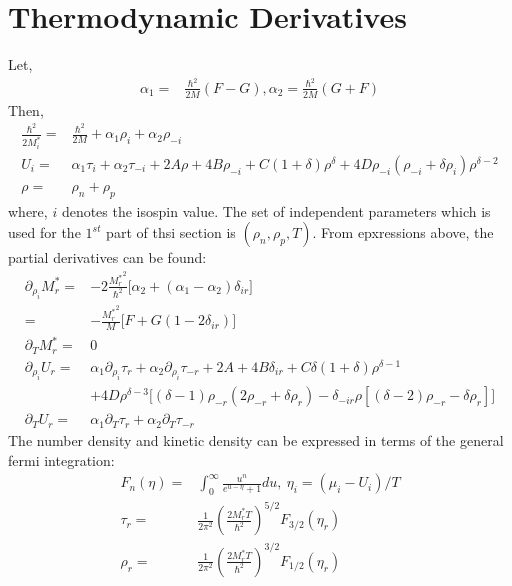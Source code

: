 \documentclass[preprint,prc,preprintnumbers,superscriptaddress,amsmath,amssymb,floatfix]{revtex4-1}
\begin{document}
\section{Thermodynamic Derivatives}
Let,
\begin{equation}
 \begin{split}
  \alpha_1=&\frac{\hbar^2}{2M}(F-G), \alpha_2 =\frac{\hbar^2}{2M} (G+F)
  \end{split}
\end{equation}
Then,
\begin{equation}
 \begin{split}
  \frac{\hbar^2}{2 M^{*}_i}=&\frac{\hbar^2}{2 M}+\alpha_1 \rho_i+\alpha_2 \rho_{-i}\\
  U_i=&\alpha_1 \tau_i+\alpha_2 \tau_{-i}+2A \rho + 4 B \rho_{-i}+ C(1+\delta)\rho^{\delta}+4 D \rho_{-i}(\rho_{-i}+\delta \rho_i)\rho^{\delta-2}\\
  \rho=&\rho_n+\rho_p
 \end{split}
\end{equation}
where, $i$ denotes the isospin value. The set of independent parameters which is used for the $1^{st}$ part of thsi section is $(\rho_n,\rho_p,T)$.
From epxressions above, the partial derivatives can be found:
\begin{equation}
 \begin{split}
  \partial_{\rho_i}M^{*}_r=&-2\frac{{M_r^{*}}^2}{\hbar^2}\big[\alpha_2+(\alpha_1-\alpha_2)\delta_{ir}\big]\\
  =&-\frac{{M_r^{*}}^2}{M}\big[F+G(1-2\delta_{ir})\big]\\
  \partial_{T}M^{*}_r =& 0\\
  \partial_{\rho_i}U_r=& \alpha_1 \partial_{\rho_i}\tau_r+\alpha_2 \partial_{\rho_i}\tau_{-r} + 2 A + 4 B \delta_{ir} + C \delta (1+\delta)\rho^{\delta-1}\\
  &+4 D \rho^{\delta-3} \big[(\delta-1)\rho_{-r}(2\rho_{-r}+\delta \rho_r)-\delta_{-ir}\rho [(\delta-2)\rho_{-r}-\delta \rho_r]\big]\\
  \partial_{T}U_r =& \alpha_1 \partial_{T}\tau_r+\alpha_2 \partial_{T}\tau_{-r}
 \end{split}
\end{equation}
The number density and kinetic density can be expressed in terms of the general fermi integration:
\begin{equation}
 \begin{split}
  F_n(\eta)=&\int_0^{\infty}\frac{u^n}{e^{u-\eta}+1}du,\ \eta_i=(\mu_i-U_i)/T\\
  \tau_r=&\frac{1}{2\pi^2}(\frac{2M^{*}_rT}{\hbar^2})^{5/2}F_{3/2}(\eta_r)\\
  \rho_r=&\frac{1}{2\pi^2}(\frac{2M_r^{*}T}{\hbar^2})^{3/2}F_{1/2}(\eta_r)\\
 \end{split}
\end{equation}
\end{document}
